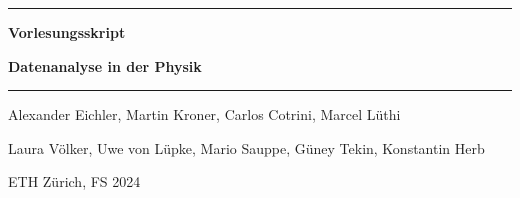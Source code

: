 \documentclass[a4paper, twoside, 11pt]{book}
\numberwithin{equation}{section} %
\numberwithin{table}{section}
\begin{document}
\hypersetup{pageanchor=false}
\begin{titlepage}
	
	
	\centering

	\hrule height 1.5pt
	\vspace{10pt}
	{\Large \bfseries Vorlesungsskript \par}
	\vspace{10pt}
	{\huge\bfseries Datenanalyse in der Physik  \par}
	\vspace{10pt}
	\hrule height 1.5pt
	
	
	\vspace{15mm}
	
	\begin{center}
		{\Large Alexander Eichler, Martin Kroner, Carlos Cotrini, Marcel Lüthi \par 
         \Large Laura V\"olker, Uwe von L\"upke, Mario Sauppe, G\"uney Tekin, Konstantin Herb\par }
		\vspace{15mm}
      
	
		
		
		\vfill
		{\large ETH Zürich, FS 2024\par}
	\end{center}
\end{titlepage}

\hypersetup{pageanchor=true}

\tableofcontents

\newpage
{}









\renewcommand*{\arraystretch}{1.2}%
\end{document}
